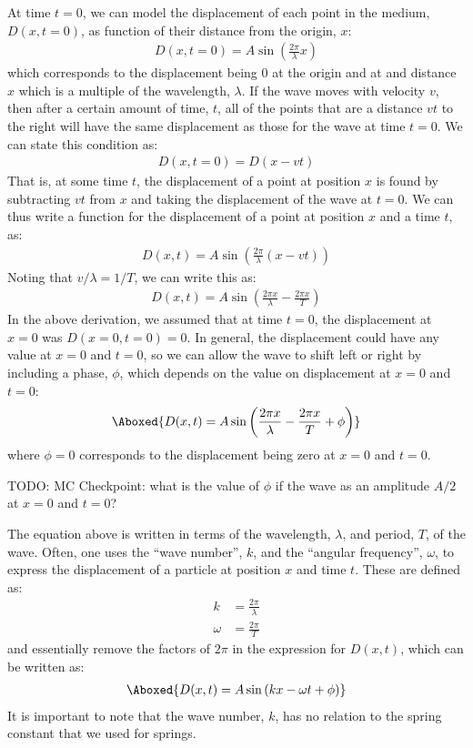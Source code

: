At time $t=0$, we can model the displacement of each point in the medium, $D(x, t=0)$, as function of their distance from the origin, $x$:
\begin{align*}
D(x,t=0) = A\sin\left( \frac{2\pi}{\lambda}x \right)
\end{align*}
which corresponds to the displacement being 0 at the origin and at and distance $x$ which is a multiple of the wavelength, $\lambda$. If the wave moves with velocity $v$, then after a certain amount of time, $t$, all of the points that are a distance $vt$ to the right will have the same displacement as those for the wave at time $t=0$. We can state this condition as:
\begin{align*}
D(x,t=0) = D(x-vt)
\end{align*} 
That is, at some time $t$, the displacement of a point at position $x$ is found by subtracting $vt$ from $x$ and taking the displacement of the wave at $t=0$. We can thus write a function for the displacement of a point at position $x$ and a time $t$, as:
\begin{align*}
D(x,t) = A\sin\left( \frac{2\pi}{\lambda}(x-vt) \right)
\end{align*}
Noting that $v/\lambda= 1/T$, we can write this as:
\begin{align*}
D(x,t) = A\sin\left( \frac{2\pi x}{\lambda}- \frac{2\pi x}{T} \right)
\end{align*}
In the above derivation, we assumed that at time $t=0$, the displacement at $x=0$ was $D(x=0, t=0)=0$. In general, the displacement could have any value at $x=0$ and $t=0$, so we can allow the wave to shift left or right by including a phase, $\phi$, which depends on the value on displacement at $x=0$ and $t=0$:
\begin{align}
\Aboxed{D(x,t) = A\sin\left( \frac{2\pi x}{\lambda}- \frac{2\pi x}{T} + \phi \right)}
\end{align}
where $\phi=0$ corresponds to the displacement being zero at $x=0$ and $t=0$.

TODO: MC Checkpoint: what is the value of $\phi$ if the wave as an amplitude $A/2$ at $x=0$ and $t=0$?

The equation above is written in terms of the wavelength, $\lambda$, and period, $T$, of the wave. Often, one uses the ``wave number'', $k$, and the ``angular frequency'', $\omega$, to express the displacement of a particle at position $x$ and time $t$. These are defined as:
\begin{align}
k &= \frac{2\pi}{\lambda}\\
\omega &= \frac{2\pi}{T}
\end{align} 
and essentially remove the factors of $2\pi$ in the expression for $D(x,t)$, which can be written as:
\begin{align}
\Aboxed{D(x,t) = A\sin\left( kx -\omega t + \phi \right)}
\end{align}
It is important to note that the wave number, $k$, has no relation to the spring constant that we used for springs. 

